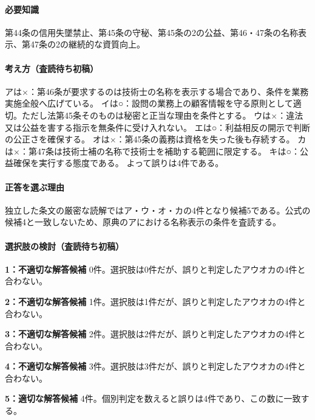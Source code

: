 \paragraph{必要知識} 第44条の信用失墜禁止、第45条の守秘、第45条の2の公益、第46・47条の名称表示、第47条の2の継続的な資質向上。

\paragraph{考え方（査読待ち初稿）} アは×：第46条が要求するのは技術士の名称を表示する場合であり、条件を業務実施全般へ広げている。 イは○：設問の業務上の顧客情報を守る原則として適切。ただし法第45条そのものは秘密と正当な理由を条件とする。 ウは×：違法又は公益を害する指示を無条件に受け入れない。 エは○：利益相反の開示で判断の公正さを確保する。 オは×：第45条の義務は資格を失った後も存続する。 カは×：第47条は技術士補の名称で技術士を補助する範囲に限定する。 キは○：公益確保を実行する態度である。 よって誤りは4件である。

\paragraph{正答を選ぶ理由} 独立した条文の厳密な読解ではア・ウ・オ・カの4件となり候補5である。公式の候補4と一致しないため、原典のアにおける名称表示の条件を査読する。

\paragraph{選択肢の検討（査読待ち初稿）}\mbox{}\par

\noindent\textbf{1：不適切な解答候補} 0件。選択肢は0件だが、誤りと判定したアウオカの4件と合わない。\par

\noindent\textbf{2：不適切な解答候補} 1件。選択肢は1件だが、誤りと判定したアウオカの4件と合わない。\par

\noindent\textbf{3：不適切な解答候補} 2件。選択肢は2件だが、誤りと判定したアウオカの4件と合わない。\par

\noindent\textbf{4：不適切な解答候補} 3件。選択肢は3件だが、誤りと判定したアウオカの4件と合わない。\par

\noindent\textbf{5：適切な解答候補} 4件。個別判定を数えると誤りは4件であり、この数に一致する。\par

